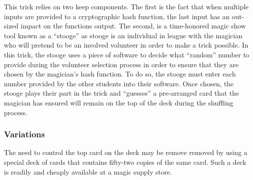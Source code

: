 This trick relies on two keep components.  The first is the fact that when
multiple inputs are provided to a cryptographic hash function, the last input
has an out-sized impact on the functions output.  The second, is a time-honored
magic show tool known as a ``stooge'' as stooge is an individual in league with
the magician who will pretend to be an involved volunteer in order to make a
trick possible.  In this trick, the stooge uses a piece of software to decide
what ``random'' number to provide during the volunteer selection process in
order to ensure that they are chosen by the magician's hash function.  To do so,
the stooge must enter each number provided by the other students into their
software.  Once chosen, the stooge plays their part in the trick and ``guesses''
a pre-arranged card that the magician has ensured will remain on the top of the
deck during the shuffling process.

\subsubsection{Variations}

The need to control the top card on the deck may be remove removed by using a
special deck of cards that contains fifty-two copies of the same card.  Such a
deck is readily and cheaply available at a magic supply store.


